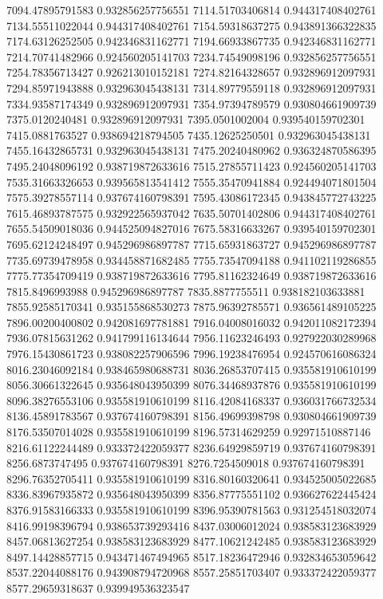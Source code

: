 {7094.47895791583 0.932856257756551
7114.51703406814 0.944317408402761
7134.55511022044 0.944317408402761
7154.59318637275 0.943891366322835
7174.63126252505 0.942346831162771
7194.66933867735 0.942346831162771
7214.70741482966 0.924560205141703
7234.74549098196 0.932856257756551
7254.78356713427 0.926213010152181
7274.82164328657 0.932896912097931
7294.85971943888 0.932963045438131
7314.89779559118 0.932896912097931
7334.93587174349 0.932896912097931
7354.97394789579 0.930804661909739
7375.0120240481 0.932896912097931
7395.0501002004 0.939540159702301
7415.0881763527 0.938694218794505
7435.12625250501 0.932963045438131
7455.16432865731 0.932963045438131
7475.20240480962 0.936324870586395
7495.24048096192 0.938719872633616
7515.27855711423 0.924560205141703
7535.31663326653 0.939565813541412
7555.35470941884 0.924494071801504
7575.39278557114 0.937674160798391
7595.43086172345 0.943845772743225
7615.46893787575 0.932922565937042
7635.50701402806 0.944317408402761
7655.54509018036 0.944525094827016
7675.58316633267 0.939540159702301
7695.62124248497 0.945296986897787
7715.65931863727 0.945296986897787
7735.69739478958 0.934458871682485
7755.73547094188 0.941102119286855
7775.77354709419 0.938719872633616
7795.81162324649 0.938719872633616
7815.8496993988 0.945296986897787
7835.8877755511 0.938182103633881
7855.92585170341 0.935155868530273
7875.96392785571 0.936561489105225
7896.00200400802 0.942081697781881
7916.04008016032 0.942011082172394
7936.07815631262 0.941799116134644
7956.11623246493 0.927922030289968
7976.15430861723 0.938082257906596
7996.19238476954 0.924570616086324
8016.23046092184 0.938465980688731
8036.26853707415 0.935581910610199
8056.30661322645 0.935648043950399
8076.34468937876 0.935581910610199
8096.38276553106 0.935581910610199
8116.42084168337 0.936031766732534
8136.45891783567 0.937674160798391
8156.49699398798 0.930804661909739
8176.53507014028 0.935581910610199
8196.57314629259 0.92971510887146
8216.61122244489 0.933372422059377
8236.64929859719 0.937674160798391
8256.6873747495 0.937674160798391
8276.7254509018 0.937674160798391
8296.76352705411 0.935581910610199
8316.80160320641 0.934525005022685
8336.83967935872 0.935648043950399
8356.87775551102 0.936627622445424
8376.91583166333 0.935581910610199
8396.95390781563 0.931254518032074
8416.99198396794 0.938653739293416
8437.03006012024 0.938583123683929
8457.06813627254 0.938583123683929
8477.10621242485 0.938583123683929
8497.14428857715 0.943471467494965
8517.18236472946 0.932834653059642
8537.22044088176 0.943908794720968
8557.25851703407 0.933372422059377
8577.29659318637 0.939949536323547
}
